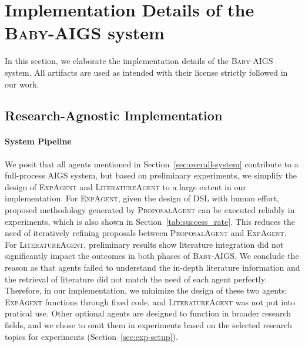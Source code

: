 \documentclass{article} %
\newcommand{\AIGS}{AIGS\xspace}
\newcommand{\AIGSSys}{\textsc{Baby-AIGS}\xspace}
\newcommand{\ProposalAgent}{\textsc{ProposalAgent}\xspace}
\newcommand{\ExperimentAgent}{\textsc{ExpAgent}\xspace}
\newcommand{\LiteratureAgent}{\textsc{LiteratureAgent}\xspace}
\newcommand{\DSL}{\textsc{DSL}\xspace}
\begin{document}



\pagebreak

\appendix
\section{Implementation Details of the \AIGSSys system}
\label{app:sys-detail}

In this section, we elaborate the implementation details of the \AIGSSys system. All artifacts are used as intended with their license strictly followed in our work.

\subsection{Research-Agnostic Implementation}

\paragraph{System Pipeline}
We posit that all agents mentioned in Section~\ref{sec:overall-system} contribute to a full-process \AIGS system, but based on preliminary experiments, we simplify the design of \ExperimentAgent and \LiteratureAgent to a large extent in our implementation. For \ExperimentAgent, given the design of \DSL with human effort, proposed methodology generated by \ProposalAgent can be executed reliably in experiments, which is also shown in Section~\ref{tab:success_rate}. This reduces the need of iteratively refining proposals between \ProposalAgent and \ExperimentAgent. For \LiteratureAgent, preliminary results show literature integration did not significantly impact the outcomes in both phases of \AIGSSys. We conclude the reason as that agents failed to understand the in-depth literature information and the retrieval of literature did not match the need of each agent perfectly. Therefore, in our implementation, we minimize the design of these two agents: \ExperimentAgent functions through fixed code, and \LiteratureAgent was not put into pratical use. Other optional agents are designed to function in broader research fields, and we chose to omit them in experiments based on the selected research topics for experiments (Section~\ref{sec:exp-setup}).
\end{document}
